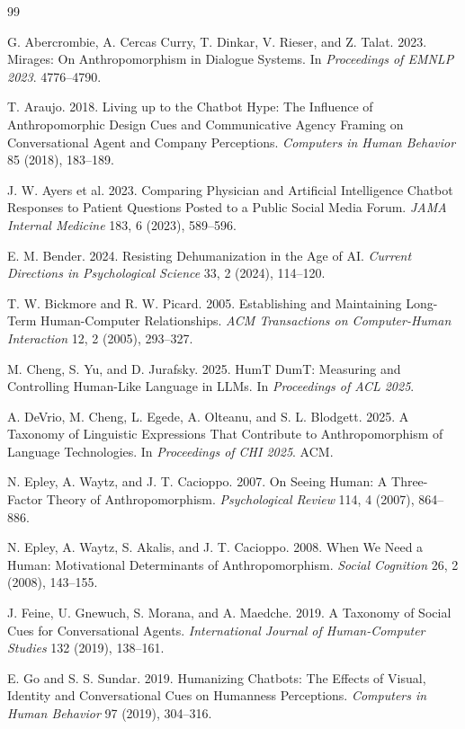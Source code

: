 \documentclass[manuscript,review,anonymous]{acmart}
\begin{document}
\begin{thebibliography}{99}

G. Abercrombie, A. Cercas Curry, T. Dinkar, V. Rieser, and Z. Talat.
2023.
Mirages: On Anthropomorphism in Dialogue Systems.
In \textit{Proceedings of EMNLP 2023}. 4776--4790.

T. Araujo.
2018.
Living up to the Chatbot Hype: The Influence of Anthropomorphic Design Cues and Communicative Agency Framing on Conversational Agent and Company Perceptions.
\textit{Computers in Human Behavior} 85 (2018), 183--189.

J. W. Ayers et al.
2023.
Comparing Physician and Artificial Intelligence Chatbot Responses to Patient Questions Posted to a Public Social Media Forum.
\textit{JAMA Internal Medicine} 183, 6 (2023), 589--596.

E. M. Bender.
2024.
Resisting Dehumanization in the Age of AI.
\textit{Current Directions in Psychological Science} 33, 2 (2024), 114--120.

T. W. Bickmore and R. W. Picard.
2005.
Establishing and Maintaining Long-Term Human-Computer Relationships.
\textit{ACM Transactions on Computer-Human Interaction} 12, 2 (2005), 293--327.

M. Cheng, S. Yu, and D. Jurafsky.
2025.
HumT DumT: Measuring and Controlling Human-Like Language in LLMs.
In \textit{Proceedings of ACL 2025}.

A. DeVrio, M. Cheng, L. Egede, A. Olteanu, and S. L. Blodgett.
2025.
A Taxonomy of Linguistic Expressions That Contribute to Anthropomorphism of Language Technologies.
In \textit{Proceedings of CHI 2025}. ACM.

N. Epley, A. Waytz, and J. T. Cacioppo.
2007.
On Seeing Human: A Three-Factor Theory of Anthropomorphism.
\textit{Psychological Review} 114, 4 (2007), 864--886.

N. Epley, A. Waytz, S. Akalis, and J. T. Cacioppo.
2008.
When We Need a Human: Motivational Determinants of Anthropomorphism.
\textit{Social Cognition} 26, 2 (2008), 143--155.

J. Feine, U. Gnewuch, S. Morana, and A. Maedche.
2019.
A Taxonomy of Social Cues for Conversational Agents.
\textit{International Journal of Human-Computer Studies} 132 (2019), 138--161.

E. Go and S. S. Sundar.
2019.
Humanizing Chatbots: The Effects of Visual, Identity and Conversational Cues on Humanness Perceptions.
\textit{Computers in Human Behavior} 97 (2019), 304--316.


\end{thebibliography}
\end{document}
